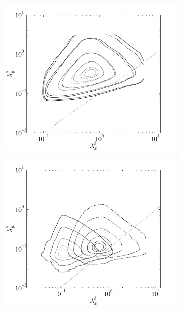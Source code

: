 \begin{figure}
\begin{subfigure}[t]{0.5\textwidth}
                \includegraphics[width=\linewidth]{Fig3/energy_contour_ABL_n2n05_level5.pdf}
                \caption{}
                \label{fig:dissip1b}
        \end{subfigure}
\centering
        \begin{subfigure}[t]{0.5\textwidth}
                \includegraphics[width=\linewidth]{Fig3/dissp_contour_ABL_n2n05_level2.pdf}
                \caption{}
                \label{fig:energy2b}
        \end{subfigure}%

\end{figure}
